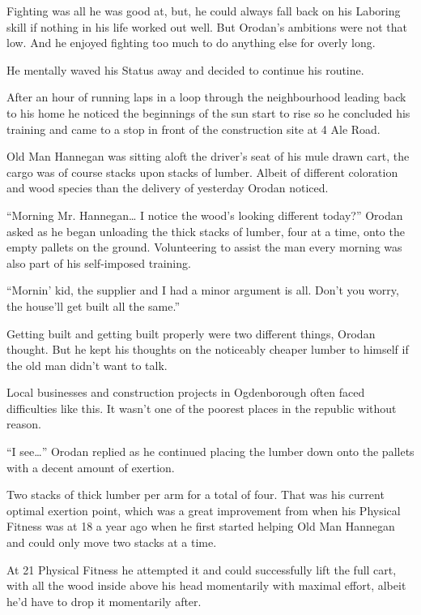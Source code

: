 \documentclass[a4paper,10pt]{book}
\begin{document}
Fighting was all he was good at, but, he could always fall back on his Laboring skill if nothing in his life worked out well. But Orodan’s ambitions were not that low. And he enjoyed fighting too much to do anything else for overly long.\par
He mentally waved his Status away and decided to continue his routine.\par
\par
After an hour of running laps in a loop through the neighbourhood leading back to his home he noticed the beginnings of the sun start to rise so he concluded his training and came to a stop in front of the construction site at 4 Ale Road.\par
Old Man Hannegan was sitting aloft the driver’s seat of his mule drawn cart, the cargo was of course stacks upon stacks of lumber. Albeit of different coloration and wood species than the delivery of yesterday Orodan noticed.\par
“Morning Mr. Hannegan… I notice the wood’s looking different today?” Orodan asked as he began unloading the thick stacks of lumber, four at a time, onto the empty pallets on the ground. Volunteering to assist the man every morning was also part of his self-imposed training.\par
“Mornin’ kid, the supplier and I had a minor argument is all. Don’t you worry, the house’ll get built all the same.”\par
Getting built and getting built properly were two different things, Orodan thought. But he kept his thoughts on the noticeably cheaper lumber to himself if the old man didn’t want to talk.\par
Local businesses and construction projects in Ogdenborough often faced difficulties like this. It wasn’t one of the poorest places in the republic without reason.\par
“I see…” Orodan replied as he continued placing the lumber down onto the pallets with a decent amount of exertion.\par
Two stacks of thick lumber per arm for a total of four. That was his current optimal exertion point, which was a great improvement from when his Physical Fitness was at 18 a year ago when he first started helping Old Man Hannegan and could only move two stacks at a time.\par
At 21 Physical Fitness he attempted it and could successfully lift the full cart, with all the wood inside above his head momentarily with maximal effort, albeit he’d have to drop it momentarily after.\par
\end{document}
